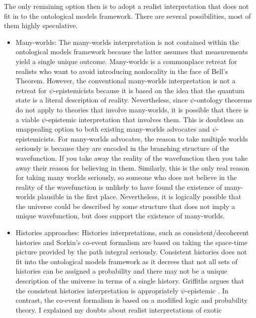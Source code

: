 \documentclass[DIV=calc,paper=a4,fontsize=11pt,twocolumn]{scrartcl} %
\theoremstyle{definition}
\theoremstyle{plain}
\begin{document}
The only remaining option then is to adopt a realist interpretation
that does not fit in to the ontological models framework.  There are
several possibilities, most of them highly speculative.

\begin{itemize}
\item Many-worlds: The many-worlds interpretation \cite{Everett1957,
DeWitt1973, Wallace2012} is not contained within the ontological
models framework because the latter assumes that measurements yield
a single unique outcome.  Many-worlds is a commonplace retreat for
realists who want to avoid introducing nonlocality in the face of
Bell's Theorem.  However, the conventional many-worlds
interpretation is not a retreat for $\psi$-epistemicists because it
is based on the idea that the quantum state is a literal description
of reality.  Nevertheless, since $\psi$-ontology theorems do not
apply to theories that involve many-worlds, it is possible that
there is a viable $\psi$-epistemic interpretation that involves
them.  This is doubtless an unappealing option to both existing
many-worlds advocates and $\psi$-epistemicists.  For many-worlds
advocates, the reason to take multiple worlds seriously is because
they are encoded in the branching structure of the wavefunction.  If
you take away the reality of the wavefunction then you take away
their reason for believing in them.  Similarly, this is the only
real reason for taking many worlds seriously, so someone who does
not believe in the reality of the wavefunction is unlikely to have
found the existence of many-worlds plausible in the first place.
Nevertheless, it is logically possible that the universe could be
described by some structure that does not imply a unique
wavefunction, but does support the existence of many-worlds.
\item Histories approaches: Histories interpretations, such as
consistent/decoherent histories \cite{Griffiths2002} and Sorkin's
co-event formalism \cite{Sorkin2007a, Sorkin2007} are based on
taking the space-time picture provided by the path integral
seriously.  Consistent histories does not fit into the ontological
models framework as it decrees that not all sets of histories can be
assigned a probability and there may not be a unique description of
the universe in terms of a single history.  Griffiths argues that
the consistent histories interpretation is appropriately
$\psi$-epistemic \cite{Griffiths2013}.  In contrast, the co-event
formalism is based on a modified logic and probability theory.  I
explained my doubts about realist interpretations of exotic

\end{itemize}
\end{document}

